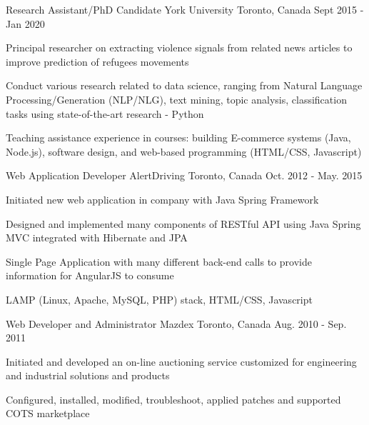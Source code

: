 \begin{cventries}
  \cventry
    {Research Assistant/PhD Candidate}
    {York University}
    {Toronto, Canada}
    {Sept 2015 - Jan 2020}
    {
      \begin{cvitems}
    \item{Principal researcher on extracting violence signals from related news articles to improve prediction of refugees movements}
      	\item{Conduct various research related to data science, ranging from Natural Language Processing/Generation (NLP/NLG), text mining, topic analysis, classification tasks using state-of-the-art research - Python}
        \item{Teaching assistance experience in courses: building E-commerce systems (Java, Node.js), software design, and web-based programming (HTML/CSS, Javascript)}
      \end{cvitems}
    }
    


  \cventry
    {Web Application Developer}
    {AlertDriving}
    {Toronto, Canada}
    {Oct. 2012 - May. 2015}
    {
      \begin{cvitems}
        \item{Initiated new web application in company with Java Spring Framework }
        \item{Designed and implemented many components of RESTful API using Java Spring MVC integrated with Hibernate and JPA}
        \item{Single Page Application with many different back-end calls to provide information for AngularJS to consume}
        \item {LAMP (Linux, Apache, MySQL, PHP) stack, HTML/CSS, Javascript}
      \end{cvitems}
    }
    
    \cventry
    {Web Developer and Administrator}
    {Mazdex}
    {Toronto, Canada}
    {Aug. 2010 - Sep. 2011}
    {
      \begin{cvitems}
        \item{Initiated and developed an on-line auctioning service customized for engineering and industrial solutions and products}
        \item{Configured, installed, modified, troubleshoot, applied patches and supported COTS marketplace}
      \end{cvitems}
    }
    
\vspace{-1em}


\end{cventries}
